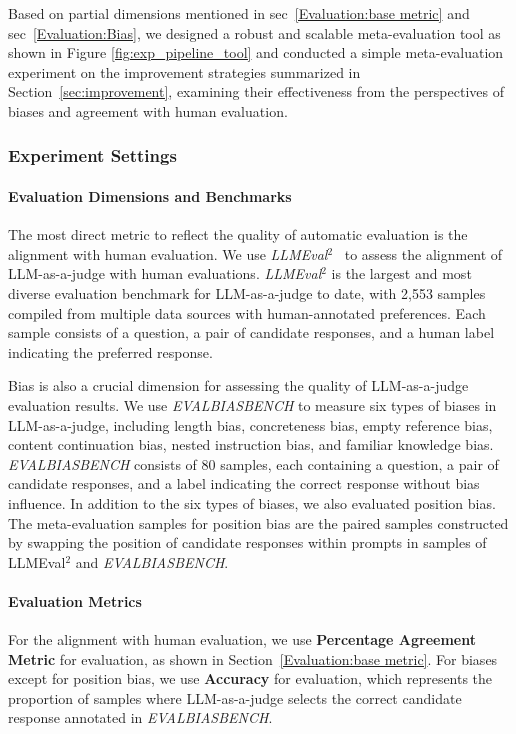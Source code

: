 Based on partial dimensions mentioned in sec~\ref{Evaluation:base metric} and sec~\ref{Evaluation:Bias}, we designed a robust and scalable meta-evaluation tool as shown in Figure \ref{fig:exp_pipeline_tool} and conducted a simple meta-evaluation experiment on the improvement strategies summarized in Section~\ref{sec:improvement}, examining their effectiveness from the perspectives of biases and agreement with human evaluation.

\subsubsection{\textbf{Experiment Settings}}
\label{subsec:exp_settings}

\paragraph{\textbf{Evaluation Dimensions and Benchmarks}}
The most direct metric to reflect the quality of automatic evaluation is the alignment with human evaluation. We use \textit{LLMEval$^2$}~\citep{zhang2023wider} to assess the alignment of LLM-as-a-judge with human evaluations. \textit{LLMEval$^2$} is the largest and most diverse evaluation benchmark for LLM-as-a-judge to date, with 2,553 samples compiled from multiple data sources with human-annotated preferences. Each sample consists of a question, a pair of candidate responses, and a human label indicating the preferred response.

Bias is also a crucial dimension for assessing the quality of LLM-as-a-judge evaluation results. We use \textit{EVALBIASBENCH}\citep{offsetbias} to measure six types of biases in LLM-as-a-judge, including length bias, concreteness bias, empty reference bias, content continuation bias, nested instruction bias, and familiar knowledge bias. \textit{EVALBIASBENCH} consists of 80 samples, each containing a question, a pair of candidate responses, and a label indicating the correct response without bias influence. In addition to the six types of biases, we also evaluated position bias. The meta-evaluation samples for position bias are the paired samples constructed by swapping the position of candidate responses within prompts in samples of LLMEval$^2$ and \textit{EVALBIASBENCH}.

\paragraph{\textbf{Evaluation Metrics}}
For the alignment with human evaluation, we use \textbf{Percentage Agreement Metric}\citep{thakur2024judging} for evaluation, as shown in Section~\ref{Evaluation:base metric}. For biases except for position bias, we use \textbf{Accuracy} for evaluation, which represents the proportion of samples where LLM-as-a-judge selects the correct candidate response annotated in \textit{EVALBIASBENCH}. 

